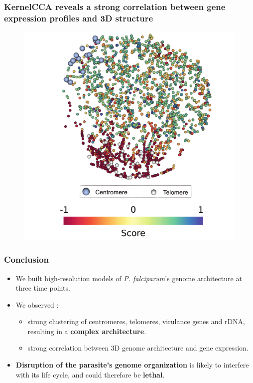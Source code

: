 \documentclass[xcolor=dvipsnames]{beamer}
\begin{document}
\begin{frame}
\frametitle{KernelCCA reveals a strong correlation between gene expression
profiles and 3D structure}
\begin{figure}
\begin{center}
\includegraphics[width=0.6\linewidth]{figures/test.png}
\end{center}
\end{figure}
\end{frame}

\begin{frame}
\frametitle{Conclusion}
\begin{itemize}[label={$\bullet$}]
\item We built high-resolution models of {\em P. falciparum}'s genome
architecture at three time points.
\item We observed :
\begin{itemize}[label={$\bullet$}]
\item strong clustering of centromeres, telomeres, virulance genes
and rDNA, resulting in a {\bf complex architecture}.
\item strong correlation between 3D genome architecture and gene expression.
\end{itemize}
\item {\bf Disruption of the parasite's genome organization} is likely to
interfere with its life cycle, and could therefore be {\bf lethal}.
\end{itemize}

\end{frame}
\end{document}
